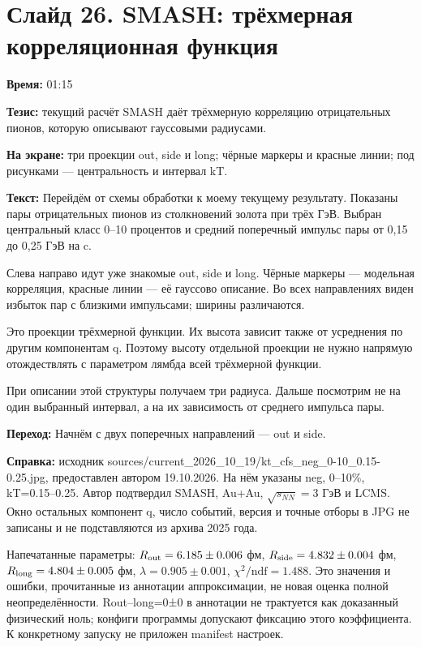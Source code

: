 \documentclass[11pt,a4paper]{article}
\begin{document}
\clearpage
\section*{Слайд 26. SMASH: трёхмерная корреляционная функция}
\textbf{Время:} 01:15

\textbf{Тезис:} текущий расчёт SMASH даёт трёхмерную корреляцию отрицательных пионов, которую описывают гауссовыми радиусами.

\textbf{На экране:} три проекции out, side и long; чёрные маркеры и красные линии; под рисунками — центральность и интервал kT.

\textbf{Текст:} Перейдём от схемы обработки к моему текущему результату. Показаны пары отрицательных пионов из столкновений золота при трёх ГэВ. Выбран центральный класс 0–10 процентов и средний поперечный импульс пары от 0,15 до 0,25 ГэВ на c.

Слева направо идут уже знакомые out, side и long. Чёрные маркеры — модельная корреляция, красные линии — её гауссово описание. Во всех направлениях виден избыток пар с близкими импульсами; ширины различаются.

Это проекции трёхмерной функции. Их высота зависит также от усреднения по другим компонентам q. Поэтому высоту отдельной проекции не нужно напрямую отождествлять с параметром лямбда всей трёхмерной функции.

При описании этой структуры получаем три радиуса. Дальше посмотрим не на один выбранный интервал, а на их зависимость от среднего импульса пары.

\textbf{Переход:} Начнём с двух поперечных направлений — out и side.

\textbf{Справка:} исходник sources/current\_2026\_10\_19/kt\_cfs\_neg\_0-10\_0.15-0.25.jpg, предоставлен автором 19.10.2026. На нём указаны neg, 0–10\%, kT=0.15–0.25. Автор подтвердил SMASH, Au+Au, \(\sqrt{s_{NN}}=3\) ГэВ и LCMS. Окно остальных компонент q, число событий, версия и точные отборы в JPG не записаны и не подставляются из архива 2025 года.

Напечатанные параметры: \(R_{\rm out}=6.185\pm0.006\) фм, \(R_{\rm side}=4.832\pm0.004\) фм, \(R_{\rm long}=4.804\pm0.005\) фм, \(\lambda=0.905\pm0.001\), \(\chi^2/\mathrm{ndf}=1.488\). Это значения и ошибки, прочитанные из аннотации аппроксимации, не новая оценка полной неопределённости. Rout–long=0±0 в аннотации не трактуется как доказанный физический ноль; конфиги программы допускают фиксацию этого коэффициента. К конкретному запуску не приложен manifest настроек.
\end{document}

